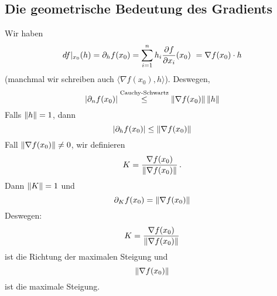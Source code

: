 \subsection{Die geometrische Bedeutung des Gradients}
Wir haben
  \[df|_{x_0}(h) = \partial_h f(x_0) =\sum_{i=1}^nh_i\dfrac{\partial f}{\partial x_i}(x_0)\
= \nabla f(x_0)\cdot h
\]
(manchmal wir schreiben auch $\langle \nabla f (x_0), h\rangle$).
Deswegen,
  \[\left| \partial_nf(x_0) \right|\stackrel{\text{Cauchy-Schwartz}}{\leq}\left\| \nabla f(x_0) \right\|\left\| h \right\|\]
  Falls $\left\| h \right\|=1$, dann
  \[\left| \partial_h f(x_0) \right|\leq\left\| \nabla f(x_0) \right\|\]
  Fall $\left\| \nabla f(x_0) \right\|\neq 0$, wir definieren
  \[K=\frac{\nabla f(x_0)}{\left\| \nabla f(x_0) \right\|}\, .\]
Dann $\left\| K \right\|=1$ und
  \[\partial_Kf(x_0)=\left\| \nabla f(x_0) \right\|\]
  Deswegen:
  \[K=\frac{\nabla f(x_0)}{\left\| \nabla f(x_0) \right\|}\]
  ist die Richtung der maximalen Steigung und
  \[\left\| \nabla f(x_0) \right\|\]
  ist die maximale Steigung.

